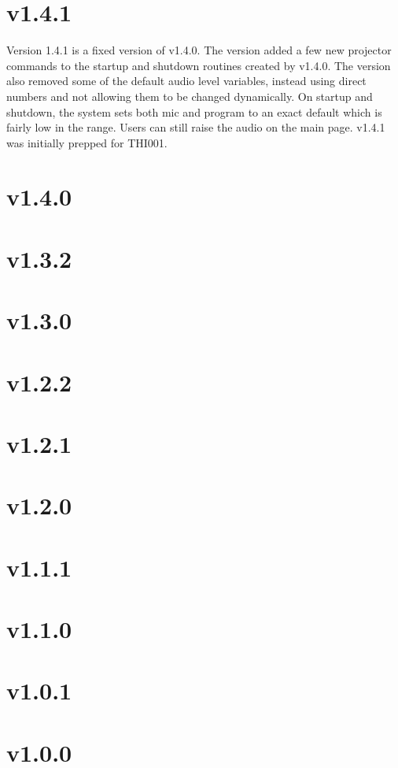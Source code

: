 \documentclass{article}
\begin{document}
\section*{v1.4.1} 

Version 1.4.1 is a fixed version of v1.4.0. The version added a few new projector commands to the startup and shutdown 
routines created by v1.4.0. The version also removed some of the default audio level variables, instead using direct 
numbers and not allowing them to be changed dynamically. On startup and shutdown, the system sets both mic and program
to an exact default which is fairly low in the range. Users can still raise the audio on the main page. v1.4.1 was initially
prepped for THI001.

\section*{v1.4.0}

\section*{v1.3.2}

\section*{v1.3.0}

\section*{v1.2.2}

\section*{v1.2.1}

\section*{v1.2.0}

\section*{v1.1.1}

\section*{v1.1.0}

\section*{v1.0.1}

\section*{v1.0.0}
\end{document}
